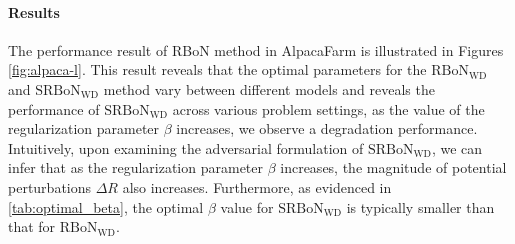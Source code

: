 \paragraph{Results}
The performance result of RBoN method in AlpacaFarm is illustrated in Figures \ref{fig:alpaca-l}.
This result reveals that the optimal parameters for the $\mathrm{RBoN}_{\mathrm{WD}}$ and $\mathrm{SRBoN}_{\mathrm{WD}}$ method vary between different models and reveals the performance of $\mathrm{SRBoN}_{\mathrm{WD}}$ across various problem settings, as the value of the regularization parameter $\beta$ increases, we observe a degradation performance. Intuitively, upon examining the adversarial formulation of $\mathrm{SRBoN}_{\mathrm{WD}}$, we can infer that as the regularization parameter $\beta$ increases, the magnitude of potential perturbations $\Delta R$ also increases. Furthermore, as evidenced in \cref{tab:optimal_beta}, the optimal $\beta$ value for $\mathrm{SRBoN}_{\mathrm{WD}}$ is typically smaller than that for $\mathrm{RBoN}_{\mathrm{WD}}$. 




